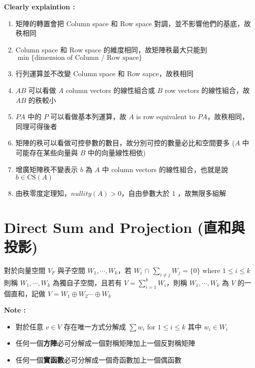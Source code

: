 \documentclass[
]{book}
\providecommand{\tightlist}{%
  \setlength{\itemsep}{0pt}\setlength{\parskip}{0pt}}
\begin{document}
\textbf{Clearly explaintion :}

\begin{enumerate}
\def\labelenumi{\arabic{enumi}.}
\tightlist
\item
  矩陣的轉置會把 Column space 和 Row space 對調，並不影響他們的基底，故秩相同
\item
  Column space 和 Row space 的維度相同，故矩陣秩最大只能到\(\min \{\mbox{dimension of Column / Row space}\}\)
\item
  行列運算並不改變 Column space 和 Row sapce，故秩相同
\item
  \(AB\) 可以看做 \(A\) column vectors 的線性組合或 \(B\) row vectors 的線性組合，故 \(AB\) 的秩較小
\item
  \(PA\) 中的 \(P\) 可以看做基本列運算，故 \(A\) is row equivalent to \(PA\)，故秩相同，同理可得後者
\item
  矩陣的秩可以看做可控參數的數目，故分別可控的數量必比和空間要多 (\(A\) 中可能存在某些向量與 \(B\) 中的向量線性相依)
\item
  增廣矩陣秩不變表示 \(b\) 為 \(A\) 中 column vectors 的線性組合，也就是說 \(b \in \mbox{CS}(A)\)
\item
  由秩零度定理知，\(nullity(A) > 0\)，自由參數大於 \(1\) ，故無限多組解
\end{enumerate}

\hypertarget{direct-sum-and-projection-ux76f4ux548cux8207ux6295ux5f71}{%
\section{Direct Sum and Projection (直和與投影)}\label{direct-sum-and-projection-ux76f4ux548cux8207ux6295ux5f71}}

對於向量空間 \(V_F\) 與子空間 \(W_1, \cdots, W_k\)，若 \(W_i\) \(\cap\) \(\displaystyle\sum_{i\neq j}W_j = \{0\}\) where \(1\leq i \leq k\) 則稱 \(W_1, \cdots, W_k\) 為獨自子空間，且若有 \(V = \displaystyle \sum_{i=1}^kW_i\)，則稱 \(W_1, \cdots, W_k\) 為 \(V\) 的一個直和，記做 \(V = W_1 \oplus W_2 \cdots \oplus W_k\)

\textbf{Note :}

\begin{itemize}
\tightlist
\item
  對於任意 \(v \in V\) 存在唯一方式分解成 \(\sum w_i\) for \(1\leq i\leq k\) 其中 \(w_i \in W_i\)
\item
  任何一個\textbf{方陣}必可分解成一個對稱矩陣加上一個反對稱矩陣
\item
  任何一個\textbf{實函數}必可分解成一個奇函數加上一個偶函數
\end{itemize}
\end{document}
